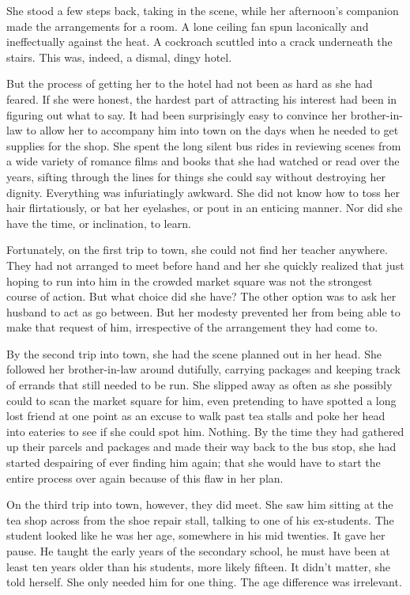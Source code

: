 \documentclass{article}
\begin{document}
She stood a few steps back, taking in the scene, while her afternoon's companion made the arrangements for a room. A lone ceiling fan spun laconically and ineffectually against the heat. A cockroach scuttled into a crack underneath the stairs. This was, indeed, a dismal, dingy hotel.

But the process of getting her to the hotel had not been as hard as she had feared.  If she were honest, the hardest part of attracting his interest had been in  figuring out what to say. It had been surprisingly easy to convince her brother-in-law to allow her to accompany him into town on the days when he needed to get supplies for the shop. She spent the long silent bus rides in reviewing scenes from a wide variety of romance films and books that she had watched or read over the years, sifting through the lines for things she could say without destroying her dignity. Everything was infuriatingly awkward. She did not know how to toss her hair flirtatiously, or bat her eyelashes, or pout in an enticing manner. Nor did she have the time, or inclination, to learn. 

Fortunately, on the first trip to town, she could not find her teacher anywhere. They had not arranged to meet before hand and her she quickly realized that just hoping to run into him in the crowded market square was not the strongest course of action. But what choice did she have? The other option was to ask her husband to act as go between. But her modesty prevented her from being able to make that request of him, irrespective of the arrangement they had come to.

By the second trip into town, she had the scene planned out in her head. She followed her brother-in-law around dutifully, carrying packages and keeping track of errands that still needed to be run. She slipped away as often as she possibly could to scan the market square for him, even pretending to have spotted a long lost friend at one point as an excuse to walk past tea stalls and poke her head into eateries to see if she could spot him. Nothing. By the time they had gathered up their parcels and packages and made their way back to the bus stop, she had started despairing of ever finding him again; that she would have to start the entire process over again because of this flaw in her plan.

On the third trip into town, however, they did meet. She saw him sitting at the tea shop across from the shoe repair stall, talking to one of his ex-students. The student looked like he was her age, somewhere in his mid twenties. It gave her pause. He taught the early years of the secondary school, he must have been at least ten years older than his students, more likely fifteen. It didn't matter, she told herself. She only needed him for one thing. The age difference was irrelevant. 
\end{document}

